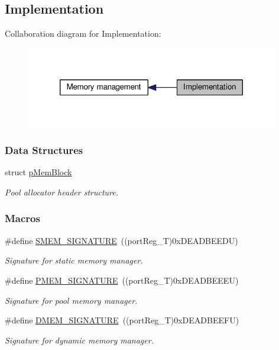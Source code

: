\hypertarget{group__mem__impl}{\subsection{Implementation}
\label{group__mem__impl}
}
Collaboration diagram for Implementation\-:\nopagebreak
\begin{figure}[H]
\begin{center}
\leavevmode
\includegraphics[width=312pt]{group__mem__impl}
\end{center}
\end{figure}
\subsubsection*{Data Structures}
\begin{DoxyCompactItemize}
\item 
struct \hyperlink{structpMemBlock}{p\-Mem\-Block}
\begin{DoxyCompactList}\small\item\em Pool allocator header structure. \end{DoxyCompactList}\end{DoxyCompactItemize}
\subsubsection*{Macros}
\begin{DoxyCompactItemize}
\item 
\#define \hyperlink{group__mem__impl_gae0fa2c7ba98034d2b0a59299edc64c66}{S\-M\-E\-M\-\_\-\-S\-I\-G\-N\-A\-T\-U\-R\-E}~((port\-Reg\-\_\-\-T)0x\-D\-E\-A\-D\-B\-E\-E\-D\-U)
\begin{DoxyCompactList}\small\item\em Signature for static memory manager. \end{DoxyCompactList}\item 
\#define \hyperlink{group__mem__impl_ga37e53ccf6c132baa9a610318a18c312e}{P\-M\-E\-M\-\_\-\-S\-I\-G\-N\-A\-T\-U\-R\-E}~((port\-Reg\-\_\-\-T)0x\-D\-E\-A\-D\-B\-E\-E\-E\-U)
\begin{DoxyCompactList}\small\item\em Signature for pool memory manager. \end{DoxyCompactList}\item 
\#define \hyperlink{group__mem__impl_ga6aeb51ed48814f4d3e0c8bd5640d4533}{D\-M\-E\-M\-\_\-\-S\-I\-G\-N\-A\-T\-U\-R\-E}~((port\-Reg\-\_\-\-T)0x\-D\-E\-A\-D\-B\-E\-E\-F\-U)
\begin{DoxyCompactList}\small\item\em Signature for dynamic memory manager. \end{DoxyCompactList}\end{DoxyCompactItemize}
